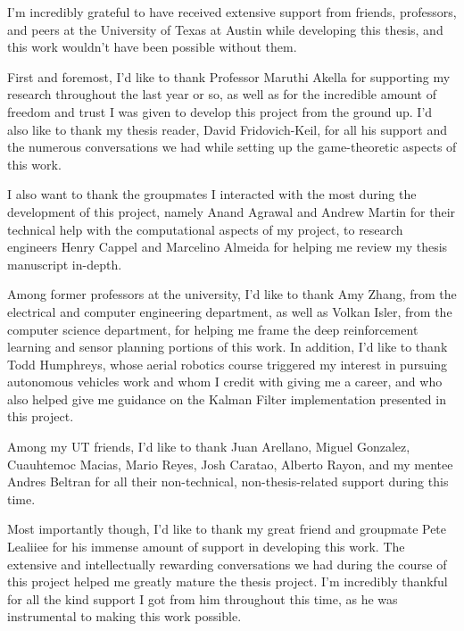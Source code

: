 \begin{acknowledgments}		%


I'm incredibly grateful to have received extensive support from friends, professors, and peers at the University of Texas at Austin while developing this thesis, and this work wouldn't have been possible without them.

First and foremost, I'd like to thank Professor Maruthi Akella for supporting my research throughout the last year or so, as well as for the incredible amount of freedom and trust I was given to develop this project from the ground up. I'd also like to thank my thesis reader, David Fridovich-Keil, for all his support and the numerous conversations we had while setting up the game-theoretic aspects of this work.

I also want to thank the groupmates I interacted with the most during the development of this project, namely Anand Agrawal and Andrew Martin for their technical help with the computational aspects of my project, to research engineers Henry Cappel and Marcelino Almeida for helping me review my thesis manuscript in-depth. 

Among former professors at the university, I'd like to thank Amy Zhang, from the electrical and computer engineering department, as well as Volkan Isler, from the computer science department, for helping me frame the deep reinforcement learning and sensor planning portions of this work. In addition, I'd like to thank Todd Humphreys, whose aerial robotics course triggered my interest in pursuing autonomous vehicles work and whom I credit with giving me a career, and who also helped give me guidance on the Kalman Filter implementation presented in this project. 

Among my UT friends, I'd like to thank Juan Arellano, Miguel Gonzalez, Cuauhtemoc Macias, Mario Reyes, Josh Caratao, Alberto Rayon, and my mentee Andres Beltran for all their non-technical, non-thesis-related support during this time.


Most importantly though, I'd like to thank my great friend and groupmate Pete Lealiiee for his immense amount of support in developing this work. The extensive and intellectually rewarding conversations we had during the course of this project helped me greatly mature the thesis project. I'm incredibly thankful for all the kind support I got from him throughout this time, as he was instrumental to making this work possible.

\end{acknowledgments}

